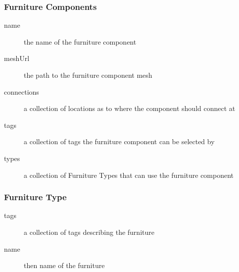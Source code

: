\subsubsection{Furniture Components}
\begin{description}
\item[name]{the name of the furniture component}
\item[meshUrl]{the path to the furniture component mesh}
\item[connections]{a collection of locations as to where the component should connect at}
\item[tags]{a collection of tags the furniture component can be selected by}
\item[types]{a collection of Furniture Types that can use the furniture component}
\end{description}

\subsubsection{Furniture Type}
\begin{description}
\item[tags]{a collection of tags describing the furniture}
\item[name]{then name of the furniture}
\end{description}

